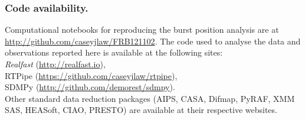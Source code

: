 \documentclass{nature_frb}
\begin{document}
\subsubsection*{Code availability.}
Computational notebooks for reproducing the burst position analysis are at \url{http://github.com/caseyjlaw/FRB121102}.
The code used to analyse the data and observations reported here is available at the following sites:\\
{\em Realfast} (\url{http://realfast.io}),\\
{RTPipe} (\url{https://github.com/caseyjlaw/rtpipe}),\\
{SDMPy} (\url{http://github.com/demorest/sdmpy}).\\
Other standard data reduction packages (AIPS, CASA, Difmap, PyRAF, XMM SAS, HEASoft, CIAO, PRESTO) are available at their respective websites.



\clearpage
\end{document}
